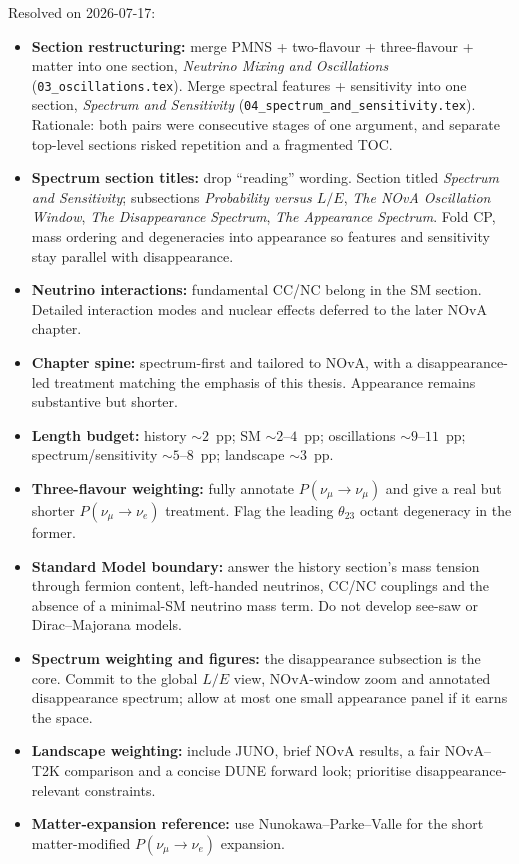\documentclass[11pt]{article}
\begin{document}
Resolved on 2026-07-17:
\begin{itemize}
    \item[$\checkmark$] \textbf{Section restructuring:} merge PMNS + two-flavour + three-flavour
    + matter into one section, \emph{Neutrino Mixing and Oscillations}
    (\texttt{03\_oscillations.tex}). Merge spectral features + sensitivity into one section,
    \emph{Spectrum and Sensitivity}
    (\texttt{04\_spectrum\_and\_sensitivity.tex}). Rationale: both pairs were consecutive stages
    of one argument, and separate top-level sections risked repetition and a fragmented TOC.
    \item[$\checkmark$] \textbf{Spectrum section titles:} drop ``reading'' wording. Section
    titled \emph{Spectrum and Sensitivity}; subsections
    \emph{Probability versus $L/E$}, \emph{The NOvA Oscillation Window},
    \emph{The Disappearance Spectrum}, \emph{The Appearance Spectrum}. Fold CP, mass ordering
    and degeneracies into appearance so features and sensitivity stay parallel with
    disappearance.
    \item[$\checkmark$] \textbf{Neutrino interactions:} fundamental CC/NC belong in the SM
    section. Detailed interaction modes and nuclear effects deferred to the later NOvA chapter.
    \item[$\checkmark$] \textbf{Chapter spine:} spectrum-first and tailored to NOvA, with a
    disappearance-led treatment matching the emphasis of this thesis. Appearance remains
    substantive but shorter.
    \item[$\checkmark$] \textbf{Length budget:} history $\sim 2$~pp; SM $\sim 2$--$4$~pp;
    oscillations $\sim 9$--$11$~pp; spectrum/sensitivity $\sim 5$--$8$~pp; landscape
    $\sim 3$~pp.
    \item[$\checkmark$] \textbf{Three-flavour weighting:} fully annotate
    $P(\nu_\mu\to\nu_\mu)$ and give a real but shorter $P(\nu_\mu\to\nu_e)$ treatment.
    Flag the leading $\theta_{23}$ octant degeneracy in the former.
    \item[$\checkmark$] \textbf{Standard Model boundary:} answer the history section's mass
    tension through fermion content, left-handed neutrinos, CC/NC couplings and the absence of a
    minimal-SM neutrino mass term. Do not develop see-saw or Dirac--Majorana models.
    \item[$\checkmark$] \textbf{Spectrum weighting and figures:} the disappearance subsection is
    the core. Commit to the global $L/E$ view, NOvA-window zoom and annotated disappearance
    spectrum; allow at most one small appearance panel if it earns the space.
    \item[$\checkmark$] \textbf{Landscape weighting:} include JUNO, brief NOvA results, a fair
    NOvA--T2K comparison and a concise DUNE forward look; prioritise disappearance-relevant
    constraints.
    \item[$\checkmark$] \textbf{Matter-expansion reference:} use
    Nunokawa--Parke--Valle for the short matter-modified
    $P(\nu_\mu\to\nu_e)$ expansion.
\end{itemize}
\end{document}
